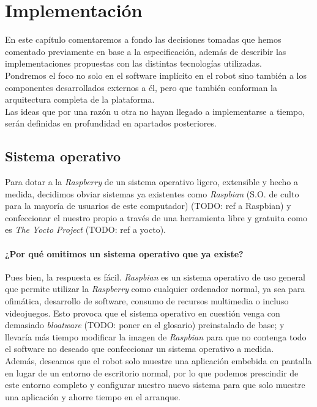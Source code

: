 \chapter{Implementación}

En este capítulo comentaremos a fondo las decisiones tomadas que hemos comentado previamente en base a la especificación, además de describir las implementaciones propuestas con las distintas tecnologías utilizadas.\\

Pondremos el foco no solo en el software implícito en el robot sino también a los componentes desarrollados externos a él, pero que también conforman la arquitectura completa de la plataforma.\\

Las ideas que por una razón u otra no hayan llegado a implementarse a tiempo, serán definidas en profundidad en apartados posteriores.

\section{Sistema operativo}

Para dotar a la \textit{Raspberry} de un sistema operativo ligero, extensible y hecho a medida, decidimos obviar sistemas ya existentes como \textit{Raspbian} (S.O. de culto para la mayoría de usuarios de este computador) (TODO: ref a Raspbian) y confeccionar el nuestro propio a través de una herramienta libre y gratuita como es \textit{The Yocto Project} (TODO: ref a yocto).

\subsubsection{¿Por qué omitimos un sistema operativo que ya existe?}

Pues bien, la respuesta es fácil. \textit{Raspbian} es un sistema operativo de uso general que permite utilizar la \textit{Raspberry} como cualquier ordenador normal, ya sea para ofimática, desarrollo de software, consumo de recursos multimedia o incluso videojuegos. Esto provoca que el sistema operativo en cuestión venga con demasiado \textit{bloatware} (TODO: poner en el glosario) preinstalado de base; y llevaría más tiempo modificar la imagen de \textit{Raspbian} para que no contenga todo el software no deseado que confeccionar un sistema operativo a medida.\\

Además, deseamos que el robot solo muestre una aplicación embebida en pantalla en lugar de un entorno de escritorio normal, por lo que podemos prescindir de este entorno completo y configurar nuestro nuevo sistema para que solo muestre una aplicación y ahorre tiempo en el arranque.\\


